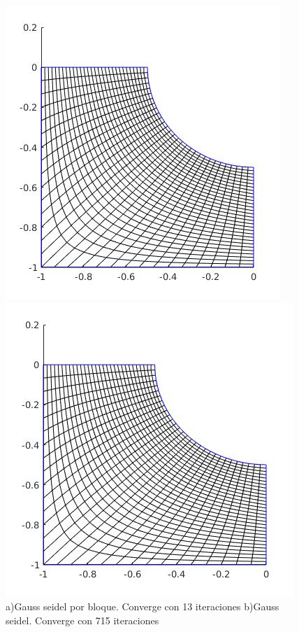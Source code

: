 \documentclass[11pt,letterpaper]{article}
\begin{document}
\begin{figure}[H]
	\begin{minipage}{.49\linewidth}
		\centering
		\includegraphics[scale=0.44]{./imgs/GSBloque.jpg}
	\end{minipage}
	\begin{minipage}{.49\linewidth}
		\centering
		\includegraphics[scale=0.44]{./imgs/GS.jpg}
	\end{minipage}
	\caption{a)Gauss seidel por bloque. Converge con 13 iteraciones b)Gauss seidel. Converge con 715 iteraciones}
\end{figure}
\end{document}
